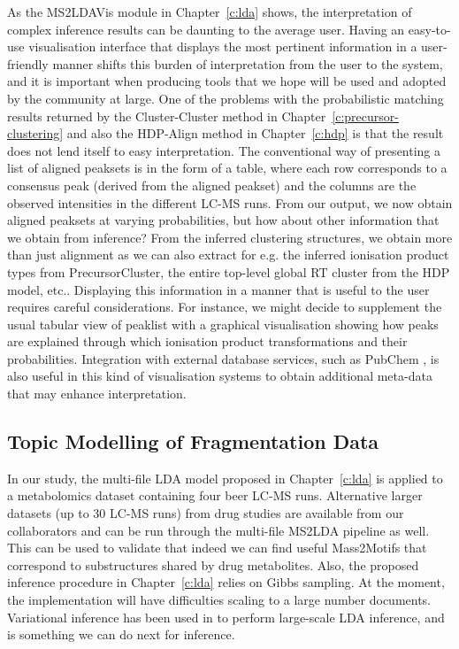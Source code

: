 As the MS2LDAVis module in Chapter~\ref{c:lda} shows, the interpretation of complex inference results can be daunting to the average user. Having an easy-to-use visualisation interface that displays the most pertinent information in a user-friendly manner shifts this burden of interpretation from the user to the system, and it is important when producing tools that we hope will be used and adopted by the community at large. One of the problems with the probabilistic matching results returned by the Cluster-Cluster method in Chapter~\ref{c:precursor-clustering} and also the HDP-Align method in Chapter~\ref{c:hdp} is that the result does not lend itself to easy interpretation. The conventional way of presenting a list of aligned peaksets is in the form of a table, where each row corresponds to a consensus peak (derived from the aligned peakset) and the columns are the observed intensities in the different LC-MS runs. From our output, we now obtain aligned peaksets at varying probabilities, but how about other information that we obtain from inference? From the inferred clustering structures, we obtain more than just alignment as we can also extract for e.g. the inferred ionisation product types from PrecursorCluster, the entire top-level global RT cluster from the HDP model, etc.. Displaying this information in a manner that is useful to the user requires careful considerations. For instance, we might decide to supplement the usual tabular view of peaklist with a graphical visualisation showing how peaks are explained through which ionisation product transformations and their probabilities. Integration with external database services, such as PubChem \cite{bolton2008pubchem}, is also useful in this kind of visualisation systems to obtain additional meta-data that may enhance interpretation. 

\subsection{Topic Modelling of Fragmentation Data}

In our study, the multi-file LDA model proposed in Chapter~\ref{c:lda} is applied to a metabolomics dataset containing four beer LC-MS runs. Alternative larger datasets (up to 30 LC-MS runs) from drug studies are available from our collaborators and can be run through the multi-file MS2LDA pipeline as well. This can be used to validate that indeed we can find useful Mass2Motifs that correspond to substructures shared by drug metabolites. Also, the proposed inference procedure in Chapter~\ref{c:lda} relies on Gibbs sampling. At the moment, the implementation will have difficulties scaling to a large number documents. Variational inference has been used in \cite{Blei2003} to perform large-scale LDA inference, and is something we can do next for inference.

